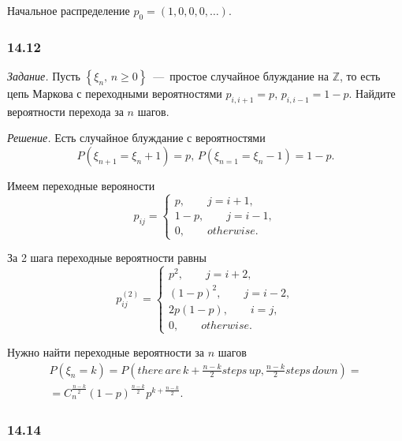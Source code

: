 Начальное распределение $p_0 = \left( 1, 0, 0, 0, \dotsc \right) $.

\subsubsection*{14.12}

\textit{Задание.}
Пусть $ \left\{ \xi_n, \, n \geq 0 \right\} $~---~простое случайное блуждание на $ \mathbb{Z}$,
то есть цепь Маркова с переходными вероятностями $p_{i, i + 1} = p, \, p_{i, i - 1} = 1 - p$.
Найдите вероятности перехода за $n$ шагов.

\textit{Решение.}
Есть случайное блуждание с вероятностями
\begin{equation*}
  P \left( \xi_{n + 1} = \xi_n + 1 \right) = p, \,
  P \left( \xi_{n = 1} = \xi_n - 1 \right) = 1 - p.
\end{equation*}

Имеем переходные верояности
\begin{equation*}
  p_{ij} =
  \begin{cases}
    p, \qquad j = i + 1, \\
    1 - p, \qquad j = i - 1, \\
    0, \qquad otherwise.
  \end{cases}
\end{equation*}

За 2 шага переходные вероятности равны
\begin{equation*}
  p_{ij}^{ \left( 2 \right) } =
  \begin{cases}
    p^2, \qquad j = i + 2, \\
    \left( 1 - p \right)^2, \qquad j = i - 2, \\
    2p \left( 1 - p \right), \qquad i = j, \\
    0, \qquad otherwise.
  \end{cases}
\end{equation*}

Нужно найти переходные вероятности за $n$ шагов
\begin{gather*}
  P \left( \xi_n = k \right) =
  P \left(
    there \, are \, k + \frac{n - k}{2} steps \, up, \frac{n - k}{2} steps \, down
  \right) = \\
  = C_n^{ \frac{n - k}{2}} \left( 1 - p \right)^{ \frac{n - k}{2}} p^{k + \frac{n - k}{2}}.
\end{gather*}

\subsubsection*{14.14}

